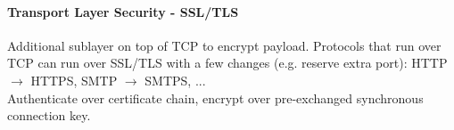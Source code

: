 \documentclass[12pt]{article}
\begin{document}
	\paragraph{Transport Layer Security - SSL/TLS} Additional sublayer on top of TCP to encrypt payload. Protocols that run over TCP can run over SSL/TLS with a few changes (e.g. reserve extra port): HTTP $\rightarrow$ HTTPS, SMTP $\rightarrow$ SMTPS, ...\\
	Authenticate over certificate chain, encrypt over pre-exchanged synchronous connection key.
	
	
	
\end{document}
